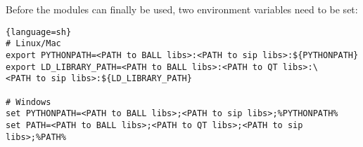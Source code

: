 Before the modules can finally be used, two environment variables need to be set:
\begin{lstlisting}{language=sh}
# Linux/Mac
export PYTHONPATH=<PATH to BALL libs>:<PATH to sip libs>:${PYTHONPATH}
export LD_LIBRARY_PATH=<PATH to BALL libs>:<PATH to QT libs>:\
<PATH to sip libs>:${LD_LIBRARY_PATH}

# Windows
set PYTHONPATH=<PATH to BALL libs>;<PATH to sip libs>;%PYTHONPATH%
set PATH=<PATH to BALL libs>;<PATH to QT libs>;<PATH to sip libs>;%PATH%
\end{lstlisting}

